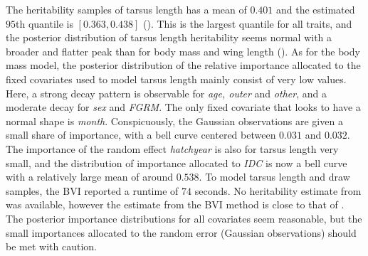 \noindent The heritability samples of tarsus length has a mean of $0.401$ and the estimated $95$th quantile is $[0.363, 0.438]$ (). This is the largest quantile for all traits, and the posterior distribution of tarsus length heritability seems normal with a broader and flatter peak than for body mass and wing length (). As for the body mass model, the posterior distribution of the relative importance allocated to the fixed covariates used to model tarsus length mainly consist of very low values. Here, a strong decay pattern is observable for \textit{age, outer} and \textit{other}, and a moderate decay for \textit{sex} and \textit{FGRM}. The only fixed covariate that looks to have a normal shape is \textit{month}. Conspicuously, the Gaussian observations are given a small share of importance, with a bell curve centered between $0.031$ and $0.032$. The importance of the random effect \textit{hatchyear} is also for tarsus length very small, and the distribution of importance allocated to \textit{IDC} is now a bell curve with a relatively large mean of around $0.538$. To model tarsus length and draw samples, the BVI reported a runtime of $74$ seconds. No heritability estimate from \citet{Muff2019Genetic} was available, however the estimate from the BVI method is close to that of \citet{Silva2017}. 
The posterior importance distributions for all covariates seem reasonable, but the small importances allocated to the random error (Gaussian observations) should be met with caution. 
